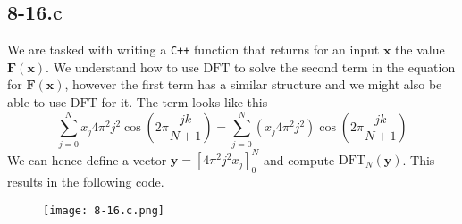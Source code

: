 \documentclass{article}
\begin{document}
\subsection*{8-16.c}
We are tasked with writing a \verb|C++| function that returns for an input $\mathbf{x}$ the value $\mathbf{F}\left(\mathbf{x}\right)$. We understand how to use $\mathrm{DFT}$ to solve the second term in the equation for $\mathbf{F}\left(\mathbf{x}\right)$, however the first term has a similar structure and we might also be able to use $\mathrm{DFT}$ for it. The term looks like this
\begin{equation*}
    \sum_{j=0}^{N}x_{j}4\pi^{2} j^{2}\cos\left(2\pi \frac{jk}{N+1}\right) = \sum_{j=0}^{N}\left(x_{j}4\pi^{2} j^{2}\right)\cos\left(2\pi \frac{jk}{N+1}\right)
\end{equation*}
We can hence define a vector $\mathbf{y} = \left[4\pi^{2}j^{2}x_{j}\right]_{0}^{N}$ and compute $\mathrm{DFT}_{N}\left(\mathbf{y}\right)$.
This results in the following code.
\begin{figure}[!hbt]
    \centering
\texttt{[image: 8-16.c.png]}
\end{figure}

\pagebreak
\end{document}
